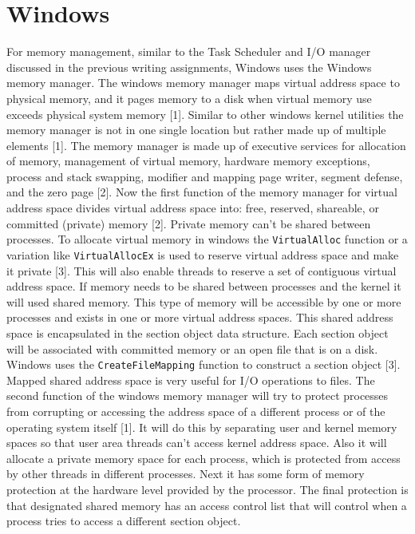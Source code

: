 \documentclass[letterpaper,10pt,titlepage,draftclsnofoot,onecolumn]{IEEEtran}
\begin{document}
\section{Windows}
For memory management, similar to the Task Scheduler and I/O manager discussed in the previous writing assignments, Windows uses the Windows memory manager. The windows memory manager maps virtual address space to physical memory, and it pages memory to a disk when virtual memory use exceeds physical system memory [1]. Similar to other windows kernel utilities the memory manager is not in one single location but rather made up of multiple elements [1]. The memory manager is made up of executive services for allocation of memory, management of virtual memory, hardware memory exceptions, process and stack swapping, modifier and mapping page writer, segment defense, and the zero page [2]. Now the first function of the memory manager for virtual address space divides virtual address space into: free, reserved, shareable, or committed (private) memory [2]. Private memory can't be shared between processes. To allocate virtual memory in windows the \texttt{VirtualAlloc} function or a variation like \texttt{VirtualAllocEx} is used to reserve virtual address space and make it private [3]. This will also enable threads to reserve a set of contiguous virtual address space. If memory needs to be shared between processes and the kernel it will used shared memory. This type of memory will be accessible by one or more processes and exists in one or more virtual address spaces. This shared address space is encapsulated in the section object data structure. Each section object will be associated with committed memory or an open file that is on a disk. Windows uses the \texttt{CreateFileMapping} function to construct a section object [3]. Mapped shared address space is very useful for I/O operations to files. The second function of the windows memory manager will try to protect processes from corrupting or accessing the address space of a different process or of the operating system itself [1]. It will do this by separating user and kernel memory spaces so that user area threads can't access kernel address space. Also it will allocate a private memory space for each process, which is protected from access by other threads in different processes. Next it has some form of memory protection at the hardware level provided by the processor. The final protection is that designated shared memory has an access control list that will control when a process tries to access a different section object.
\end{document}
